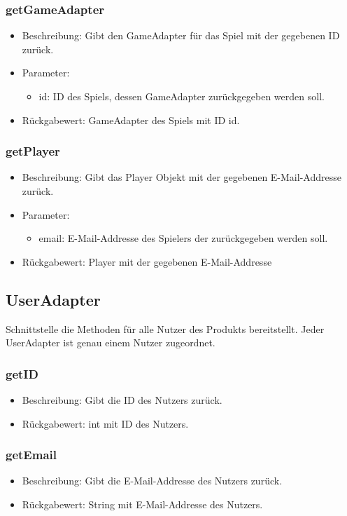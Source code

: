 \documentclass[a4paper]{scrreprt}
\begin{document}
	\subsubsection{getGameAdapter}
	\begin{itemize}
		\item Beschreibung: Gibt den GameAdapter für das Spiel mit der gegebenen ID zurück.
		\item Parameter:
		\begin{itemize}
			\item id: ID des Spiels, dessen GameAdapter zurückgegeben werden soll.
		\end{itemize}
		\item Rückgabewert: GameAdapter des Spiels mit ID id.
	\end{itemize}

	\subsubsection{getPlayer}
	\begin{itemize}
		\item Beschreibung: Gibt das Player Objekt mit der gegebenen E-Mail-Addresse zurück.
		\item Parameter:
		\begin{itemize}
			\item email: E-Mail-Addresse des Spielers der zurückgegeben werden soll.
		\end{itemize}
		\item Rückgabewert: Player mit der gegebenen E-Mail-Addresse
	\end{itemize}
	
	\subsection{UserAdapter}
	Schnittstelle die Methoden für alle Nutzer des Produkts bereitstellt.
	Jeder UserAdapter ist genau einem Nutzer zugeordnet.
	
	\subsubsection{getID}
	\begin{itemize}
		\item Beschreibung: Gibt die ID des Nutzers zurück.
		\item Rückgabewert: int mit ID des Nutzers.
	\end{itemize}
	
	\subsubsection{getEmail}
	\begin{itemize}
		\item Beschreibung: Gibt die E-Mail-Addresse des Nutzers zurück.
		\item Rückgabewert: String mit E-Mail-Addresse des Nutzers.
	\end{itemize}
	
\end{document}
